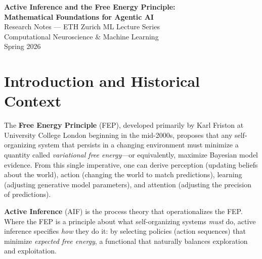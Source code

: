 \documentclass[11pt,a4paper]{article}
\theoremstyle{definition}
\begin{document}
\begin{center}
  {\LARGE \textbf{Active Inference and the Free Energy Principle:}}\\[4pt]
  {\LARGE \textbf{Mathematical Foundations for Agentic AI}}\\[12pt]
  {\large Research Notes --- ETH Zurich ML Lecture Series}\\[8pt]
  {\normalsize Computational Neuroscience \& Machine Learning}\\[4pt]
  {\small Spring 2026}
\end{center}

\vspace{1em}

\begin{abstract}
These notes provide a mathematically rigorous introduction to the Free Energy
Principle (FEP) and Active Inference, a unified framework originating in
computational neuroscience that casts perception, learning, and action as
variational inference.  We derive variational free energy from first
principles, formalize Markov blankets and their controversies, develop the
Expected Free Energy objective for planning, and connect these ideas to modern
agentic AI---including reinforcement learning, large language models, and
multi-agent systems.  We present the framework's critics fairly, survey open
problems, and provide an annotated bibliography for further study.
\end{abstract}

\tableofcontents
\newpage

\section{Introduction and Historical Context}
\label{sec:intro}

The \textbf{Free Energy Principle} (FEP), developed primarily by Karl Friston
at University College London beginning in the mid-2000s, proposes that any
self-organizing system that persists in a changing environment must minimize a
quantity called \emph{variational free energy}---or equivalently, maximize
Bayesian model evidence.  From this single imperative, one can derive
perception (updating beliefs about the world), action (changing the world to
match predictions), learning (adjusting generative model parameters), and
attention (adjusting the precision of predictions).

\textbf{Active Inference} (AIF) is the process theory that operationalizes the
FEP.  Where the FEP is a principle about what self-organizing systems
\emph{must} do, active inference specifies \emph{how} they do it: by selecting
policies (action sequences) that minimize \emph{expected free energy}, a
functional that naturally balances exploration and exploitation.
\end{document}
